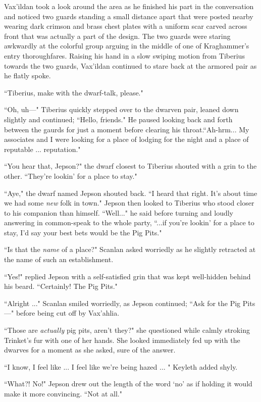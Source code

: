 Vax'ildan took a look around the area as he finished his part in the conversation and noticed two guards standing a small distance apart that were posted nearby wearing dark crimson and brass chest plates with a uniform scar carved across front that was actually a part of the design. The two guards were staring awkwardly at the colorful group arguing in the middle of one of Kraghammer's entry thoroughfares. Raising his hand in a slow swiping motion from Tiberius towards the two guards, Vax'ildan continued to stare back at the armored pair as he flatly spoke. 

``Tiberius, make with the dwarf-talk, please."

``Oh, uh---" Tiberius quickly stepped over to the dwarven pair, leaned down slightly and continued; ``Hello, friends." He  paused looking back and forth between the gaurds for just a moment before clearing his throat.``Ah-hrm... My associates and I were looking for a place of lodging for the night and a place of reputable ... reputation."

``You hear that, Jepson?" the dwarf closest to Tiberius shouted with a grin to the other. ``They're lookin' for a place to stay."

``Aye," the dwarf named Jepson shouted back. ``I heard that right. It's about time we had some \textit{new} folk in town." Jepson then looked to Tiberius who stood closer to his companion than himself. ``Well..." he said before turning and loudly answering in common-speak to the whole party, ``...if you're lookin' for a place to stay, I'd say your best bets would be the Pig Pits."

``Is that the \textit{name} of a place?" Scanlan asked worriedly as he slightly retracted at the name of such an establishment. 

``Yes!" replied Jepson with a self-satisfied grin that was kept well-hidden behind his beard. ``Certainly! The Pig Pits."

``Alright ..." Scanlan smiled worriedly, as Jepson continued; ``Ask for the Pig Pits---" before being cut off by Vax'ahlia.

``Those are \textit{actually} pig pits, aren't they?" she questioned while calmly stroking Trinket's fur with one of her hands. She looked immediately fed up with the dwarves for a moment as she asked, sure of the answer.

``I know, I feel like ... I feel like we're being hazed ... " Keyleth added shyly.

``What?! No!" Jepson drew out the length of the word `no' as if holding it would make it more convincing. ``Not at all." 

